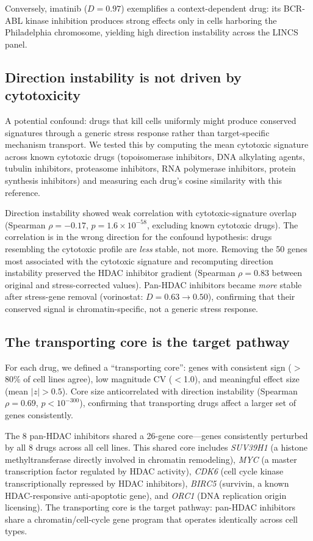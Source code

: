 \documentclass{article}
\begin{document}
Conversely, imatinib ($D = 0.97$) exemplifies a context-dependent drug:
its BCR-ABL kinase inhibition produces strong effects only in cells
harboring the Philadelphia chromosome, yielding high direction instability
across the LINCS panel.

\subsection{Direction instability is not driven by cytotoxicity}

A potential confound: drugs that kill cells uniformly might produce
conserved signatures through a generic stress response rather than
target-specific mechanism transport. We tested this by computing the
mean cytotoxic signature across known cytotoxic drugs (topoisomerase
inhibitors, DNA alkylating agents, tubulin inhibitors, proteasome
inhibitors, RNA polymerase inhibitors, protein synthesis inhibitors)
and measuring each drug's cosine similarity with this reference.

Direction instability showed weak correlation with cytotoxic-signature
overlap (Spearman $\rho = -0.17$, $p = 1.6 \times 10^{-58}$,
excluding known cytotoxic drugs). The correlation is in the wrong
direction for the confound hypothesis: drugs resembling the cytotoxic
profile are \emph{less} stable, not more. Removing the 50 genes
most associated with the cytotoxic signature and recomputing direction
instability preserved the HDAC inhibitor gradient (Spearman
$\rho = 0.83$ between original and stress-corrected values). Pan-HDAC
inhibitors became \emph{more} stable after stress-gene removal
(vorinostat: $D = 0.63 \to 0.50$), confirming that their conserved
signal is chromatin-specific, not a generic stress response.

\subsection{The transporting core is the target pathway}

For each drug, we defined a ``transporting core'': genes with consistent
sign ($>$80\% of cell lines agree), low magnitude CV ($<$1.0), and
meaningful effect size (mean $|z| > 0.5$). Core size anticorrelated with
direction instability (Spearman $\rho = 0.69$, $p < 10^{-300}$),
confirming that transporting drugs affect a larger set of genes
consistently.

The 8 pan-HDAC inhibitors shared a 26-gene core---genes consistently
perturbed by all 8 drugs across all cell lines. This shared core
includes \emph{SUV39H1} (a histone methyltransferase directly involved
in chromatin remodeling), \emph{MYC} (a master transcription factor
regulated by HDAC activity), \emph{CDK6} (cell cycle kinase
transcriptionally repressed by HDAC inhibitors), \emph{BIRC5}
(survivin, a known HDAC-responsive anti-apoptotic gene), and \emph{ORC1}
(DNA replication origin licensing). The transporting core is the target
pathway: pan-HDAC inhibitors share a chromatin/cell-cycle gene program
that operates identically across cell types.
\end{document}
